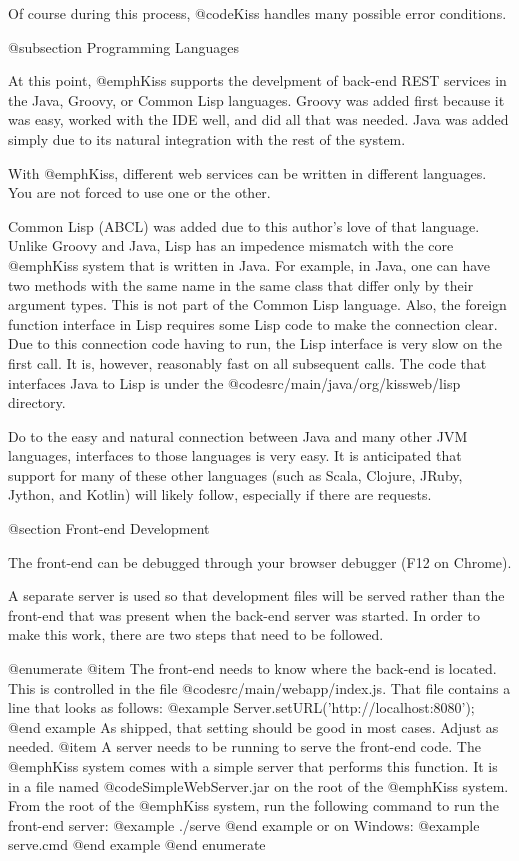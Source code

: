 Of course during this process, @code{Kiss} handles many possible error conditions.

@subsection Programming Languages

At this point, @emph{Kiss} supports the develpment of back-end REST
services in the Java, Groovy, or Common Lisp languages.  Groovy was
added first because it was easy, worked with the IDE well, and did all
that was needed.  Java was added simply due to its natural integration
with the rest of the system.

With @emph{Kiss}, different web services can be written in different
languages.  You are not forced to use one or the other.

Common Lisp (ABCL) was added due to this author's love of that
language.  Unlike Groovy and Java, Lisp has an impedence mismatch with
the core @emph{Kiss} system that is written in Java.  For example, in
Java, one can have two methods with the same name in the same class
that differ only by their argument types.  This is not part of the
Common Lisp language.  Also, the foreign function interface in Lisp
requires some Lisp code to make the connection clear.  Due to this
connection code having to run, the Lisp interface is very slow on the
first call.  It is, however, reasonably fast on all subsequent calls.
The code that interfaces Java to Lisp is under the
@code{src/main/java/org/kissweb/lisp} directory.

Do to the easy and natural connection between Java and many other JVM
languages, interfaces to those languages is very easy.  It is
anticipated that support for many of these other languages (such as
Scala, Clojure, JRuby, Jython, and Kotlin) will likely follow,
especially if there are requests.

@section Front-end Development

The front-end can be debugged through your browser debugger (F12 on Chrome).

A separate server is used so that development files will be served
rather than the front-end that was present when the back-end server
was started.  In order to make this work, there are two steps that
need to be followed.

@enumerate
@item
The front-end needs to know where the back-end is located.  This is controlled in the file @code{src/main/webapp/index.js}.
That file contains a line that looks as follows:
@example
    Server.setURL('http://localhost:8080');
@end example
As shipped, that setting should be good in most cases.  Adjust as needed.
@item
A server needs to be running to serve the front-end code.  The
@emph{Kiss} system comes with a simple server that performs this
function.  It is in a file named @code{SimpleWebServer.jar} on the
root of the @emph{Kiss} system.  From the root of the @emph{Kiss}
system, run the following command to run the front-end server:
@example
   ./serve
@end example
or on Windows:
@example
   serve.cmd
@end example
@end enumerate

